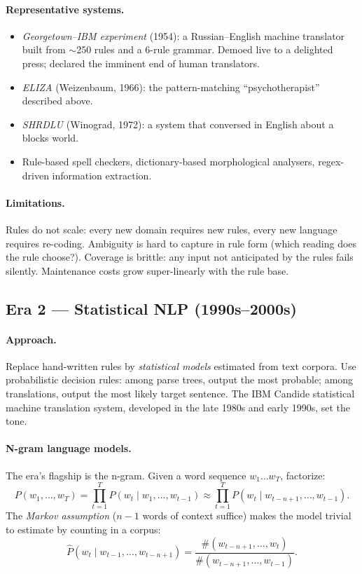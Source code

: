 \paragraph{Representative systems.}
\begin{itemize}
    \item \emph{Georgetown--IBM experiment} (1954): a Russian--English machine translator built from $\sim$250 rules and a 6-rule grammar. Demoed live to a delighted press; declared the imminent end of human translators.
    \item \emph{ELIZA} (Weizenbaum, 1966): the pattern-matching ``psychotherapist'' described above.
    \item \emph{SHRDLU} (Winograd, 1972): a system that conversed in English about a blocks world.
    \item Rule-based spell checkers, dictionary-based morphological analysers, regex-driven information extraction.
\end{itemize}

\paragraph{Limitations.} Rules do not scale: every new domain requires new rules, every new language requires re-coding. Ambiguity is hard to capture in rule form (which reading does the rule choose?). Coverage is brittle: any input not anticipated by the rules fails silently. Maintenance costs grow super-linearly with the rule base.

\subsection{Era 2 --- Statistical NLP (1990s--2000s)}

\paragraph{Approach.} Replace hand-written rules by \emph{statistical models} estimated from text corpora. Use probabilistic decision rules: among parse trees, output the most probable; among translations, output the most likely target sentence. The IBM Candide statistical machine translation system, developed in the late 1980s and early 1990s, set the tone.

\paragraph{N-gram language models.} The era's flagship is the n-gram. Given a word sequence $w_1 \dots w_T$, factorize:
\[ P(w_1, \dots, w_T) = \prod_{t=1}^{T} P(w_t \mid w_1, \dots, w_{t-1}) \approx \prod_{t=1}^{T} P(w_t \mid w_{t-n+1}, \dots, w_{t-1}). \]
The \emph{Markov assumption} ($n-1$ words of context suffice) makes the model trivial to estimate by counting in a corpus:
\[ \widehat{P}(w_t \mid w_{t-1}, \dots, w_{t-n+1}) = \frac{\#(w_{t-n+1}, \dots, w_t)}{\#(w_{t-n+1}, \dots, w_{t-1})}. \]
